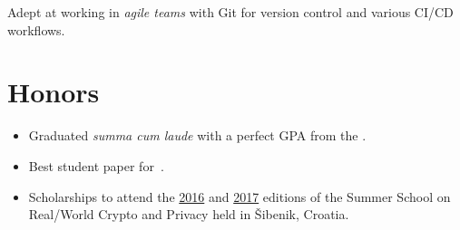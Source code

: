 \documentclass[%
version=last,%
fontsize=11pt,%
paper=A4,%
areasetadvanced,%
headinclude=false,%
footinclude=false,%
headlines=0,%
footlines=0,%
toc=bibnumbered,%
]{scrartcl}
\begin{document}
\begin{minipage}[t]{.4\textwidth}
  \begingroup\small%
  Adept at working in \emph{agile teams} with Git for version control and
  various CI/CD workflows.\par%
  \endgroup

  \section{Honors}%
  \label{sec:honors}

  \begin{itemize}[leftmargin=*]
  \item Graduated \emph{summa cum laude} with a perfect GPA from the
    .
  \item Best student paper
    for~\autocite{Gjorgjevski:Combining_LWE-Solving_Algorithms}.
  \item Scholarships to attend the
    \href{http://summerschool-croatia.cs.ru.nl/2016/}{2016} and
    \href{http://summerschool-croatia.cs.ru.nl/2017/}{2017} editions of the
    Summer School on Real\-/World Crypto and Privacy held in Šibenik, Croatia.
  \end{itemize}
\end{minipage}
\end{document}
